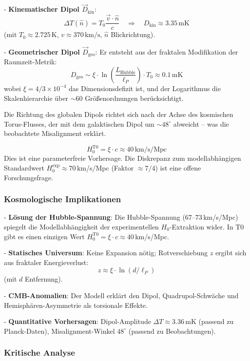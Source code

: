 \documentclass[12pt,a4paper]{article}
\begin{document}
	- \textbf{Kinematischer Dipol $\vec{D}_{\text{kin}}$}:
	\[
	\Delta T(\hat{n}) = T_0 \frac{\vec{v} \cdot \hat{n}}{c} \quad \Rightarrow \quad D_{\text{kin}} \approx 3.35\,\text{mK}
	\]
	(mit $T_0 \approx 2.725\,\text{K}$, $v \approx 370\,\text{km/s}$, $\hat{n}$ Blickrichtung).
	
	- \textbf{Geometrischer Dipol $\vec{D}_{\text{geo}}$}:
	Er entsteht aus der fraktalen Modifikation der Raumzeit-Metrik:
	\[
	D_{\text{geo}} \sim \xi \cdot \ln\left(\frac{L_{\text{Hubble}}}{\ell_P}\right) \cdot T_0 \approx 0.1\,\text{mK}
	\]
	wobei $\xi = 4/3 \times 10^{-4}$ das Dimensionsdefizit ist, und der Logarithmus die Skalenhierarchie über $\sim 60$ Größenordnungen berücksichtigt.
	
	Die Richtung des globalen Dipols richtet sich nach der Achse des kosmischen Torus-Flusses, der mit dem galaktischen Dipol um $\sim 48^\circ$ abweicht – was die beobachtete Misalignment erklärt.
	
	\[
	H_0^{\text{T0}} = \xi \cdot c \approx 40\,\text{km/s/Mpc}
	\]
	Dies ist eine parameterfreie Vorhersage. Die Diskrepanz zum modellabhängigen Standardwert $H_0^{\text{exp}} \approx 70\,$km/s/Mpc (Faktor $\approx 7/4$) ist eine offene Forschungsfrage.
	
	\subsubsection{Kosmologische Implikationen}
	
	- \textbf{Lösung der Hubble-Spannung}: Die Hubble-Spannung ($67$--$73\,$km/s/Mpc) spiegelt die Modellabhängigkeit der experimentellen $H_0$-Extraktion wider. In T0 gibt es einen einzigen Wert $H_0^{\text{T0}} = \xi \cdot c \approx 40\,$km/s/Mpc.
	
	- \textbf{Statisches Universum}: Keine Expansion nötig; Rotverschiebung $z$ ergibt sich aus fraktaler Energieverlust:
	\[
	z \approx \xi \cdot \ln(d / \ell_P)
	\]
	(mit $d$ Entfernung).
	
	- \textbf{CMB-Anomalien}: Der Modell erklärt den Dipol, Quadrupol-Schwäche und Hemisphären-Asymmetrie als torsionale Effekte.
	
	- \textbf{Quantitative Vorhersagen}: Dipol-Amplitude $\Delta T \approx 3.36\,\text{mK}$ (passend zu Planck-Daten), Misalignment-Winkel $48^\circ$ (passend zu Beobachtungen).
	
	\subsubsection{Kritische Analyse}
	
\end{document}
